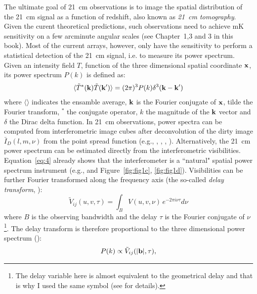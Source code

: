 The ultimate goal of 21~cm observations is to image the spatial distribution of the 21~cm signal as a function of redshift, also known as {\it 21~cm tomography}. Given the curent theoretical predictions, such observations need to achieve mK sensitivity on a few arcminute angular scales (see Chapter~1,3 and 3 in this book). Most of the current arrays, however, only have the sensitivity to perform a statistical detection of the 21~cm signal, i.e. to measure its power spectrum. Given an intensity field $T$, function of the three dimensional spatial coordinate $\bf x$, its power spectrum $P(k)$ is defined as:
\begin{equation}
\langle {\tilde T}^* ({\bf k}) {\tilde T}({\bf k'}) \rangle = (2 \pi)^3 P(k) \delta^3({\bf k} - {\bf k}')
\label{sec_observables_eq1}
\end{equation}
where $\langle \rangle$ indicates the ensamble average, $\bf k$ is the Fourier conjugate of $\bf x$, tilde the Fourier transform, $^*$ the conjugate operator, $k$ the magnitude of the $\bf k$ vector and $\delta$ the Dirac delta function. In 21~cm observations, power spectra can be computed from interferometric image cubes after deconvolution of the dirty image ${\bar I}_D (l,m,\nu)$ from the point spread function (e.g., \cite{pen09}, \cite{harker10}, \cite{beardsley16}, \cite{patil17}). Alternatively, the 21~cm power spectrum can be estimated directly from the interferometric visibilities. Equation~\ref{eq:4} already shows that the interferometer is a ``natural" spatial power spectrum instrument (e.g., \cite{white99} and Figure~\ref{fig:fig1c}, \ref{fig:fig1d}). Visibilities can be further Fourier transformed along the frequency axis (the so-called {\it delay transform}, \cite{parsons12a}): 
\begin{equation}
{\tilde V}_{ij} (u,v, \tau) = \int_B V (u,v, \nu) \, e^{-2 \pi i \nu \tau} d \nu
\label{sec_observables_eq2}
\end{equation}
where $B$ is the observing bandwidth and the delay $\tau$ is the Fourier conjugate of $\nu$\footnote{The delay variable here is almost equivalent to the geometrical delay and that is why I used the same symbol (see \cite{parsons12a} for details).}. The delay transform is therefore proportional to the three dimensional power spectrum (\cite{parsons12b}):
\begin{equation}
P(k) \propto {\tilde V}_{ij} (|{\bf b}|, \tau),
\label{sec_observables_eq3}
\end{equation}
